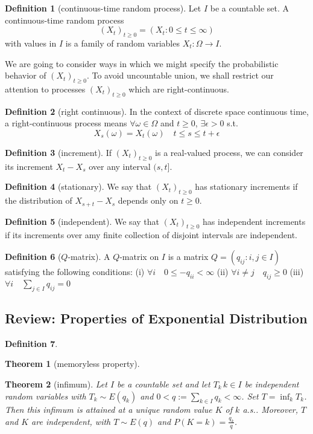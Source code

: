 \documentclass{article}
\newtheorem{Thm}{Theorem}[section]
\theoremstyle{definition}
\newtheorem{Def}{Definition}[section]
\begin{document}
\begin{Def}[continuous-time random process]
    Let $I$ be a countable set. A continuous-time random process \[(X_t)_{t\ge 0}=(X_t:0\le t\le\infty)\] 
    with values in $I$ is a family of random variables $X_t:\Omega\to I$.
\end{Def}
We are going to consider ways in which we might specify the probabilistic behavior of $(X_t)_{t\ge 0}$.
To avoid uncountable union, we shall restrict our attention to processes $(X_t)_{t\ge 0}$ which are right-continuous.
\begin{Def}[right continuous]
    In the context of discrete space continuous time, a right-continuous process means $\forall \omega\in\Omega$
    and $t\ge 0$, $\exists \epsilon>0$ s.t. \[X_s(\omega)=X_t(\omega)\quad t\le s\le t+\epsilon\]
\end{Def}
\begin{Def}[increment]
    If $(X_t)_{t\ge 0}$ is a real-valued process, we can consider its increment $X_t-X_s$ over any interval $(s,t]$.
\end{Def}
\begin{Def}[stationary]
    We say that $(X_t)_{t\ge 0}$ has stationary increments if the distribution of $X_{s+t}-X_s$ depends only on $t\ge 0$.
\end{Def}
\begin{Def}[independent]
    We say that $(X_t)_{t\ge 0}$ has independent increments if its increments over amy finite collection of disjoint intervals are independent.
\end{Def}
\begin{Def}[$Q$-matrix]
    A $Q$-matrix on $I$ is a matrix $Q=(q_{ij}:i,j\in I)$ satisfying the following conditions:\newline
(i) $\forall i\quad 0\le -q_{ii}<\infty$ \newline 
(ii) $\forall i\ne j\quad q_{ij}\ge 0$\newline 
(iii) $\forall i\quad \sum_{j\in I}q_{ij}=0$
\end{Def}

\subsection{Review: Properties of Exponential Distribution}
\begin{Def}
    
\end{Def}
\begin{Thm}[memoryless property]
    
\end{Thm}
\begin{Thm}[infimum]
    Let $I$ be a countable set and let $T_k\,k\in I$ be independent random variables with $T_k \sim E(q_k)$ and $0 < q := \sum_{k\in I} q_k < \infty$. 
    Set $T = \inf_k T_k$. Then this infimum is attained at a unique random value $K$ of $k$ a.s.. Moreover, $T$ and $K$ are independent, with $T \sim E(q)$ and $P(K = k) = \frac{q_k}{q}$.

\end{Thm}
\end{document}
